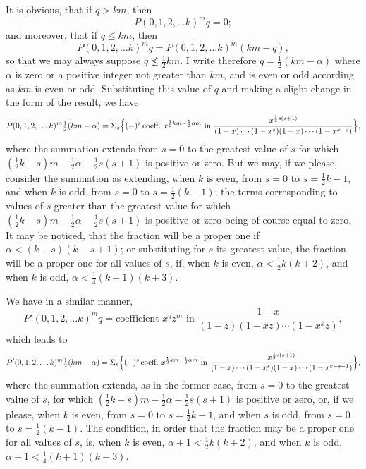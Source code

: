 \documentclass[11pt]{article}
\begin{document}
It is obvious, that if $q > km$, then
\[
P(0, 1, 2, \ldots k)^m q = 0;
\]
and moreover, that if $q \leq km$, then
\[
P(0, 1, 2, \ldots k)^m q = P(0, 1, 2, \ldots k)^m (km - q),
\]
so that we may always suppose $q \nleq \tfrac{1}{2}km$. I write therefore $q = \tfrac{1}{2}(km - \alpha)$ where $\alpha$ is zero or a positive integer not greater than $km$, and is even or odd according as $km$ is even or odd. Substituting this value of $q$ and making a slight change in the form of the result, we have
\[
P(0, 1, 2, \ldots k)^m \tfrac{1}{2}(km - \alpha) = \Sigma_s\Bigl\{(-)^s\,\text{coeff.\ } x^{\frac{1}{2}k m - \frac{1}{2}\alpha m} \text{ in } \frac{x^{\frac{1}{2}s(s+1)}}{(1-x)\cdots(1-x^s)(1-x)\cdots(1-x^{k-s})}\Bigr\},
\]
where the summation extends from $s = 0$ to the greatest value of $s$ for which $(\tfrac{1}{2}k - s)m - \tfrac{1}{2}\alpha - \tfrac{1}{2}s(s+1)$ is positive or zero. But we may, if we please, consider the summation as extending, when $k$ is even, from $s = 0$ to $s = \tfrac{1}{2}k - 1$, and when $k$ is odd, from $s = 0$ to $s = \tfrac{1}{2}(k-1)$; the terms corresponding to values of $s$ greater than the greatest value for which $(\tfrac{1}{2}k - s)m - \tfrac{1}{2}\alpha - \tfrac{1}{2}s(s+1)$ is positive or zero being of course equal to zero. It may be noticed, that the fraction will be a proper one if $\alpha < (k - s)(k - s + 1)$; or substituting for $s$ its greatest value, the fraction will be a proper one for all values of $s$, if, when $k$ is even, $\alpha < \tfrac{1}{2}k(k + 2)$, and when $k$ is odd, $\alpha < \tfrac{1}{4}(k+1)(k+3)$.

We have in a similar manner,
\[
P'(0, 1, 2, \ldots k)^m q = \text{coefficient } x^q z^m \text{ in } \frac{1-x}{(1-z)(1-xz)\cdots(1-x^k z)},
\]
which leads to
\[
P'(0, 1, 2, \ldots k)^m \tfrac{1}{2}(km - \alpha) = \Sigma_s\Bigl\{(-)^s\,\text{coeff.\ } x^{\frac{1}{2}k m - \frac{1}{2}\alpha m} \text{ in } \frac{x^{\frac{1}{2}s(s+1)}}{(1-x)\cdots(1-x^s)(1-x)\cdots(1-x^{k-s-1})}\Bigr\},
\]
where the summation extends, as in the former case, from $s = 0$ to the greatest value of $s$, for which $(\tfrac{1}{2}k - s)m - \tfrac{1}{2}\alpha - \tfrac{1}{2}s(s+1)$ is positive or zero, or, if we please, when $k$ is even, from $s = 0$ to $s = \tfrac{1}{2}k - 1$, and when $s$ is odd, from $s = 0$ to $s = \tfrac{1}{2}(k - 1)$. The condition, in order that the fraction may be a proper one for all values of $s$, is, when $k$ is even, $\alpha + 1 < \tfrac{1}{2}k(k + 2)$, and when $k$ is odd, $\alpha + 1 < \tfrac{1}{4}(k + 1)(k + 3)$.
\end{document}
